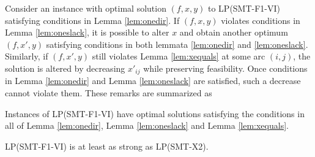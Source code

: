 Consider an instance with optimal solution $(f,x,y)$ to LP(SMT-F1-VI) satisfying conditions in Lemma \ref{lem:onedir}.
If $(f,x,y)$ violates conditions in Lemma \ref{lem:oneslack}, it is possible to alter $x$ and obtain another optimum $(f,x',y)$ satisfying conditions in both lemmata \ref{lem:onedir} and \ref{lem:oneslack}.
Similarly, if $(f,x',y)$ still violates Lemma \ref{lem:xequals} at some arc $(i,j)$, the solution is altered by decreasing $x'_{ij}$ while preserving feasibility.
Once conditions in Lemma \ref{lem:onedir} and Lemma \ref{lem:oneslack} are satisfied, such a decrease cannot violate them.
These remarks are summarized as 
\begin{obs}
Instances of LP(SMT-F1-VI) have optimal solutions satisfying the conditions in all of Lemma \ref{lem:onedir}, Lemma \ref{lem:oneslack} and Lemma \ref{lem:xequals}.
\end{obs}
\begin{prop}
\label{prop:f1strx2}
LP(SMT-F1-VI) is at least as strong as LP(SMT-X2). 
\end{prop}
